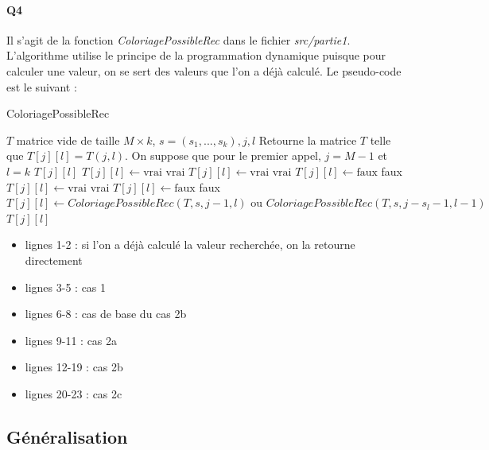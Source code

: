\documentclass[12pt]{article}
\newcommand{\true}{\text{vrai}}
\newcommand{\false}{\text{faux}}
\begin{document}
			\paragraph{Q4}
				Il s'agit de la fonction \textit{ColoriagePossibleRec} dans le fichier \textit{src/partie1}. L'algorithme utilise le principe de la programmation dynamique puisque pour calculer une valeur, on se sert des valeurs que l'on a déjà calculé. Le pseudo-code est le suivant :
				\begin{algorithm} [H]
					\caption{ColoriagePossibleRec}
					\label{color_poss_rec}
					\begin{algorithmic}[1]
						\REQUIRE $T$ matrice vide de taille $ M \times k $, $ s=(s_1,...,s_k), j, l$ 
						\ENSURE Retourne la matrice $ T $ telle que $ T[j][l] = T(j,l) $. On suppose que pour le premier appel, $ j = M-1 $ et $ l = k $
						\RETURN $ T[j][l] $
						\STATE $ T[j][l] \leftarrow \true $
						\RETURN $ \true $
						\STATE $ T[j][l] \leftarrow \true $
						\RETURN $ \true $
						\STATE $ T[j][l] \leftarrow \false $
						\RETURN faux
						\STATE $ T[j][l] \leftarrow \true $
						\RETURN vrai
						\ELSE
						\STATE$ T[j][l] \leftarrow \false $
						\RETURN faux
						\ENDIF
						\ELSE
						\STATE $ T[j][l] \leftarrow ColoriagePossibleRec(T,s,j-1,l) \text{ ou } ColoriagePossibleRec(T,s,j-s_l-1,l-1) $
						\RETURN $ T[j][l] $
						\ENDIF\begin{flushleft}
							
						\end{flushleft}
					\end{algorithmic}
				\end{algorithm}
				
				\begin{itemize}
					\item lignes 1-2 : si  l'on a déjà calculé la valeur recherchée, on la retourne directement
					\item lignes 3-5 : cas 1
					\item lignes 6-8 : cas de base du cas 2b
					\item lignes 9-11 : cas 2a
					\item lignes 12-19 : cas 2b
					\item lignes 20-23 : cas 2c
				\end{itemize}
	
		\subsection{Généralisation}
		
\end{document}
